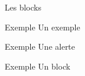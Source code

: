 \documentclass[9pt]{beamer}
\begin{document}
\begin{frame}{Les blocks}
	\begin{exampleblock}{Exemple}
		Un exemple
	\end{exampleblock}
	\begin{alertblock}{Exemple}
		Une alerte
	\end{alertblock}
	\begin{block}{Exemple}
		Un block
	\end{block}
\end{frame}
\end{document}
